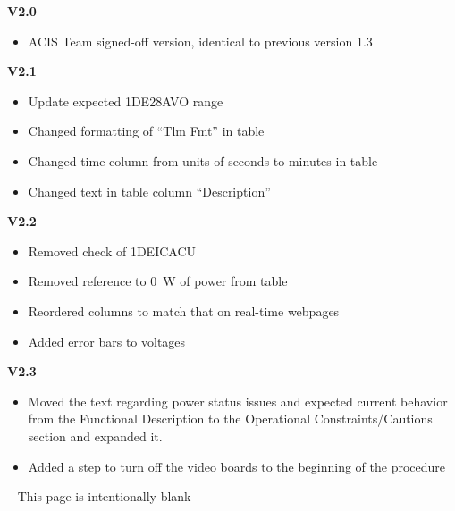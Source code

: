 \documentclass[11pt]{article}
\begin{document}
{\bf V2.0}
\begin{itemize}
\item ACIS Team signed-off version, identical to previous version 1.3
\end{itemize}

{\bf V2.1}
\begin{itemize}
\item Update expected 1DE28AVO range
\item Changed formatting of ``Tlm Fmt'' in table
\item Changed time column from units of seconds to minutes in table
\item Changed text in table column ``Description''
\end{itemize}

{\bf V2.2}
\begin{itemize}
\item Removed check of 1DEICACU
\item Removed reference to 0~W of power from table
\item Reordered columns to match that on real-time webpages
\item Added error bars to voltages
\end{itemize}

{\bf V2.3}
\begin{itemize}
\item Moved the text regarding power status issues and expected current behavior 
from the Functional Description to the Operational Constraints/Cautions section 
and expanded it.
\item Added a step to turn off the video boards to the beginning of the procedure
\end{itemize}

\newpage\
\vspace{0.4\textheight}
\bc This page is intentionally blank \ec

\newcommand{\tablecaptiontext}{TURN OFF DEA A}

\end{document}
